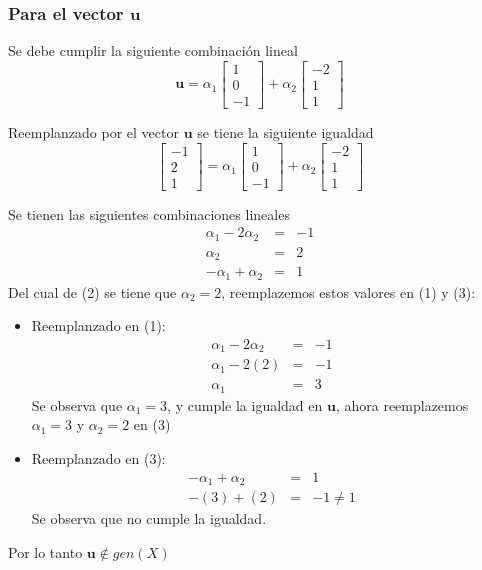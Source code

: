 \subsubsection{Para el vector $\mathbf{u}$}
Se debe cumplir la siguiente combinación lineal
\[
\mathbf{u} = {\alpha}_{1}
\begin{bmatrix}
1 \\ 
0 \\ 
-1
\end{bmatrix}
+ {\alpha}_{2}
\begin{bmatrix}
-2 \\ 
1 \\ 
1
\end{bmatrix}
\]

Reemplanzado por el vector $\mathbf{u}$ se tiene la siguiente igualdad
\[
\begin{bmatrix}
-1 \\ 
2 \\ 
1
\end{bmatrix}
= {\alpha}_{1}
\begin{bmatrix}
1 \\ 
0 \\ 
-1
\end{bmatrix}
+ {\alpha}_{2}
\begin{bmatrix}
-2 \\ 
1 \\ 
1
\end{bmatrix}
\]

Se tienen las siguientes combinaciones lineales
\begin{eqnarray}
    {\alpha}_{1} - 2 {\alpha}_{2} &=& -1 \\
    {\alpha}_{2} &=& 2 \\
    -{\alpha}_{1} + {\alpha}_{2} &=& 1
\end{eqnarray}
Del cual de (2) se tiene que $\alpha_2 = 2$, reemplazemos estos valores en (1) y (3):
\begin{itemize}
     \item Reemplanzado en (1):
     \begin{eqnarray}
         {\alpha}_{1} - 2 {\alpha}_{2} &=& -1 \nonumber \\
         {\alpha}_{1} - 2 (2) &=& -1 \nonumber \\
         {\alpha}_{1} &=& 3 \nonumber
     \end{eqnarray}
     Se observa que ${\alpha}_{1} = 3$, y cumple la igualdad en $\mathbf{u}$, ahora reemplazemos ${\alpha}_{1} = 3$ y ${\alpha}_{2} = 2$ en (3) 
     \item Reemplanzado en (3):
     \begin{eqnarray}
         -{\alpha}_{1} + {\alpha}_{2} &=& 1 \nonumber \\
         -(3) + (2) &=& -1 \neq 1 \nonumber
     \end{eqnarray}
     Se observa que no cumple la igualdad.
 \end{itemize} 
Por lo tanto $\mathbf{u} \notin gen(X)$

